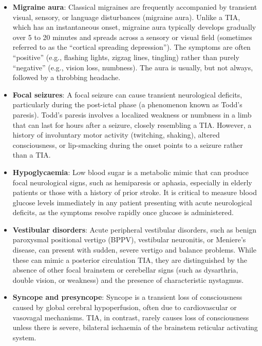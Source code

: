 \begin{itemize}
    \item \textbf{Migraine aura}: Classical migraines are frequently accompanied by transient visual, sensory, or language disturbances (migraine aura). Unlike a TIA, which has an instantaneous onset, migraine aura typically develops gradually over 5 to 20 minutes and spreads across a sensory or visual field (sometimes referred to as the ``cortical spreading depression''). The symptoms are often ``positive'' (e.g., flashing lights, zigzag lines, tingling) rather than purely ``negative'' (e.g., vision loss, numbness). The aura is usually, but not always, followed by a throbbing headache.

    \item \textbf{Focal seizures}: A focal seizure can cause transient neurological deficits, particularly during the post-ictal phase (a phenomenon known as Todd's paresis). Todd's paresis involves a localized weakness or numbness in a limb that can last for hours after a seizure, closely resembling a TIA. However, a history of involuntary motor activity (twitching, shaking), altered consciousness, or lip-smacking during the onset points to a seizure rather than a TIA.

    \item \textbf{Hypoglycaemia}: Low blood sugar is a metabolic mimic that can produce focal neurological signs, such as hemiparesis or aphasia, especially in elderly patients or those with a history of prior stroke. It is critical to measure blood glucose levels immediately in any patient presenting with acute neurological deficits, as the symptoms resolve rapidly once glucose is administered.

    \item \textbf{Vestibular disorders}: Acute peripheral vestibular disorders, such as benign paroxysmal positional vertigo (BPPV), vestibular neuronitis, or Meniere's disease, can present with sudden, severe vertigo and balance problems. While these can mimic a posterior circulation TIA, they are distinguished by the absence of other focal brainstem or cerebellar signs (such as dysarthria, double vision, or weakness) and the presence of characteristic nystagmus.

    \item \textbf{Syncope and presyncope}: Syncope is a transient loss of consciousness caused by global cerebral hypoperfusion, often due to cardiovascular or vasovagal mechanisms. TIA, in contrast, rarely causes loss of consciousness unless there is severe, bilateral ischaemia of the brainstem reticular activating system.


\end{itemize}
